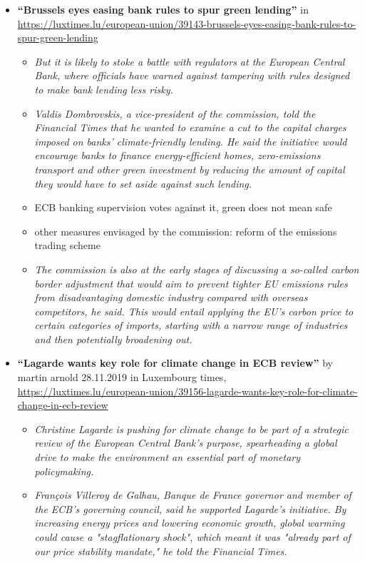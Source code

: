 \documentclass{article}
\begin{document}
\begin{itemize}
\item \textbf{``Brussels eyes easing bank rules to spur green lending''} in \url{https://luxtimes.lu/european-union/39143-brussels-eyes-easing-bank-rules-to-spur-green-lending}
\begin{itemize}
	\item \textit{But it is likely to stoke a battle with regulators at the European Central Bank, where officials have warned against tampering with rules designed to make bank lending less risky.}
	\item \textit{Valdis Dombrovskis, a vice-president of the commission, told the Financial Times that he wanted to examine a cut to the capital charges imposed on banks' climate-friendly lending. He said the initiative would encourage banks to finance energy-efficient homes, zero-emissions transport and other green investment by reducing the amount of capital they would have to set aside against such lending.}
	\item ECB banking supervision votes against it, green does not mean safe
	\item other measures envisaged by the commission: reform of the emissions trading scheme
	\item \textit{The commission is also at the early stages of discussing a so-called carbon border adjustment that would aim to prevent tighter EU emissions rules from disadvantaging domestic industry compared with overseas competitors, he said. This would entail applying the EU's carbon price to certain categories of imports, starting with a narrow range of industries and then potentially broadening out.}
\end{itemize}

\item \textbf{``Lagarde wants key role for climate change in ECB review''} by martin arnold
28.11.2019
 in Luxembourg times, \url{https://luxtimes.lu/european-union/39156-lagarde-wants-key-role-for-climate-change-in-ecb-review}
\begin{itemize}
	\item \textit{Christine Lagarde is pushing for climate change to be part of a strategic review of the European Central Bank's purpose, spearheading a global drive to make the environment an essential part of monetary policymaking.}
	\item \textit{François Villeroy de Galhau, Banque de France governor and member of the ECB's governing council, said he supported Lagarde's initiative. By increasing energy prices and lowering economic growth, global warming could cause a "stagflationary shock", which meant it was "already part of our price stability mandate," he told the Financial Times.}
	

\end{itemize}
\end{itemize}
\end{document}
